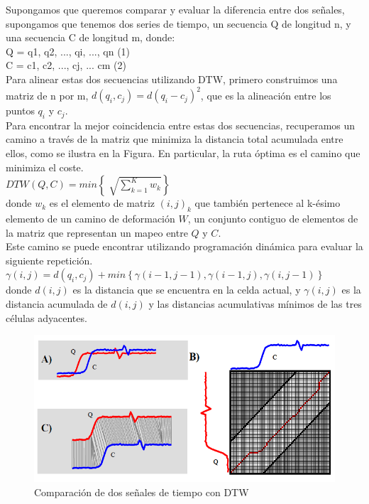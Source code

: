 Supongamos que queremos comparar y evaluar la diferencia entre dos señales, supongamos que tenemos dos series de tiempo, un secuencia Q de longitud n, y una secuencia C de longitud m, donde: \\
Q = q1, q2, ..., qi, ..., qn 	(1)\\
C = c1, c2, ..., cj, ... cm 	(2)\\

Para alinear estas dos secuencias utilizando DTW, primero construimos una matriz de n por m,  $d(q_i,c_j) = d(q_i - c_j)^2$, que es la alineación entre los puntos  $q_i$ y $c_j$.\\
Para encontrar la mejor coincidencia entre estas dos secuencias, recuperamos un camino a través de la matriz que minimiza la distancia total acumulada entre ellos, como se ilustra en la Figura. En particular, la ruta óptima es el camino que minimiza el coste.\\

$DTW(Q,C)=min\left\{{\sqrt[]{\sum_{k=1}^K{w_k}}}\right\}$ \\

donde $w_k$ es el elemento de matriz $(i, j)_k$ que también pertenece al k-ésimo elemento de un camino de deformación $W$, un conjunto contiguo de elementos de la matriz que representan un mapeo entre $Q$ y $C$.\\

Este camino se puede encontrar utilizando programación dinámica para evaluar la siguiente repetición.\\
$ \gamma (i, j) = d (q_i, c_j) + min \left\{{\gamma (i-1, j-1), \gamma (i-1, j), \gamma (i, j-1)}\right\} $ \\

donde $d(i, j)$ es la distancia que se encuentra en la celda actual, y $\gamma (i, j)$ es la distancia acumulada de $d (i, j)$ y las distancias acumulativas mínimos de las tres células adyacentes.\\

\begin{figure}[h]%
	\begin{center}
		\includegraphics[scale=0.55]{./Figuras/DTWGraficas}
	\end{center}
	\caption{Comparación de dos señales de tiempo con DTW}
	\label{fig:comparacionsenalesdtw}
\end{figure}


